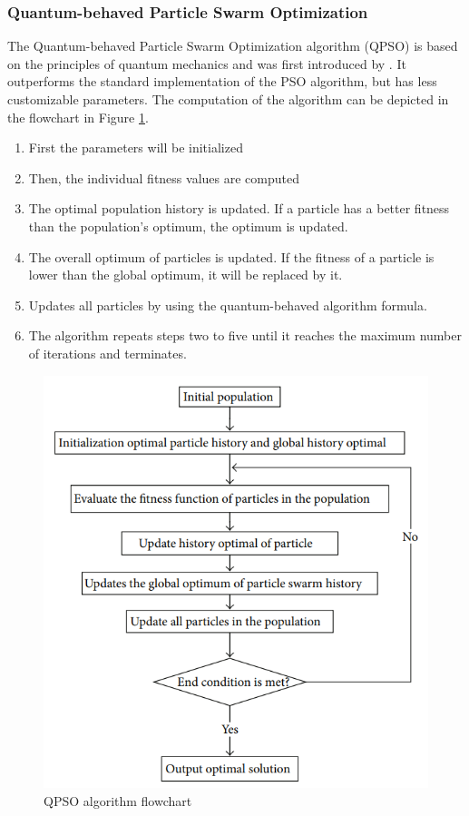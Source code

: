 \documentclass[conference]{IEEEtran}
\begin{document}
	\subsubsection{Quantum-behaved Particle Swarm Optimization}
	The Quantum-behaved Particle Swarm Optimization algorithm (QPSO) is based on the principles of quantum mechanics \cite{Yumin2014} and was first introduced by \cite{Sun2004ParticleSO}. It outperforms the standard implementation of the PSO algorithm, but has less customizable parameters. The computation of the algorithm can be depicted in the flowchart in Figure \ref{fig:qpso}.
	\begin{enumerate}
        \item First the parameters will be initialized
        \item Then, the individual fitness values are computed
        \item The optimal population history is updated. If a particle has a better fitness than the population's optimum, the optimum is updated.
        \item The overall optimum of particles is updated. If the fitness of a particle is lower than the global optimum, it will be replaced by it.
        \item Updates all particles by using the quantum-behaved algorithm formula.
        \item The algorithm repeats steps two to five until it reaches the maximum number of iterations and terminates.
    \end{enumerate}
	
	\begin{figure}[h]
    		\centering
    		\includegraphics[width=\textwidth/2]{qpso.PNG}
    		\caption{QPSO algorithm flowchart\cite{Yumin2014}}
    		\label{fig:qpso}
	\end{figure}
	
\end{document}
